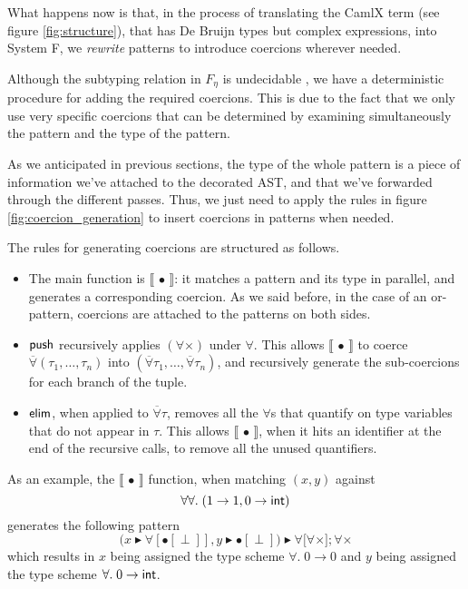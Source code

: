 \documentclass[10pt,a4paper,twoside,titlepage,twocolumn]{article}
\newcommand{\forallvec}{\ensuremath{\overline{\forall}}}
\begin{document}
What happens now is that, in the process of translating the CamlX term
(see figure \vref{fig:structure}), that has De Bruijn types but complex
expressions, into System F, we \emph{rewrite} patterns to introduce coercions
wherever needed.

Although the subtyping relation in $F_\eta$ is undecidable \cite{mitchell-88},
we have a deterministic procedure for adding the required coercions. This is due
to the fact that we only use very specific coercions that can be determined by
examining simultaneously the pattern and the type of the pattern.

As we anticipated in previous sections, the type of the whole pattern is a piece
of information we've attached to the decorated AST, and that we've forwarded
through the different passes. Thus, we just need to apply the rules in figure
\vref{fig:coercion_generation} to insert coercions in patterns when needed.

The rules for generating coercions are structured as follows.
\begin{itemize}
  \item The main function is $\llbracket\,\bullet\,\rrbracket$: it matches a
    pattern and its type in parallel, and generates a corresponding coercion. As
    we said before, in the case of an or-pattern, coercions are attached to the
    patterns on both sides.
  \item $\text{\textsf{push}}$ recursively applies $(\forall\times)$ under $\forall$. This
    allows $\llbracket\,\bullet\,\rrbracket$ to coerce $\forallvec (\tau_1,
    \dots, \tau_n)$ into $(\forallvec \tau_1, \dots, \forallvec \tau_n)$, and
    recursively generate the sub-coercions for each branch of the tuple.
  \item $\text{\textsf{elim}}$, when applied to $\forallvec\tau$, removes all the
    $\forall$s that quantify on type variables that do not appear in $\tau$.
    This allows $\llbracket\,\bullet\,\rrbracket$, when it hits an identifier at
    the end of the recursive calls, to remove all the unused quantifiers.
\end{itemize}

As an example, the $\llbracket\,\bullet\,\rrbracket$ function, when matching
$(x, y)$ against $$\forall\forall.\; (1 \to 1, 0 \to \text{\textsf{int}})$$
generates the following pattern
$$\big(x \blacktriangleright \forall[\bullet[\perp]],
   y \blacktriangleright \bullet[\perp]\big)
\blacktriangleright \forall\big[\forall\times\big]; \forall\times$$
which results in $x$ being assigned the type scheme $\forall.\; 0 \to 0$ and $y$
being assigned the type scheme $\forall.\; 0 \to \text{\textsf{int}}$.
\end{document}
